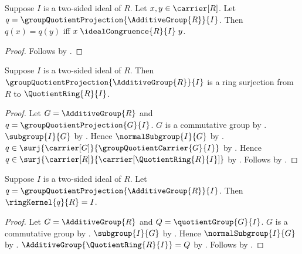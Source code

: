 \begin{corollary}\label{quotient_ring_projection_eq_iff_ideal_congruence}
    Suppose $I$ is a two-sided ideal of $R$.
    Let $x,y\in\carrier[R]$.
    Let $q=\groupQuotientProjection{\AdditiveGroup{R}}{I}$.
    Then $q(x)=q(y)$ iff $x\mathrel{\idealCongruence{R}{I}}y$.
\end{corollary}
\begin{proof}
    Follows by
        .
\end{proof}

\begin{theorem}\label{quotient_ring_projection_surjective}
    Suppose $I$ is a two-sided ideal of $R$.
    Then $\groupQuotientProjection{\AdditiveGroup{R}}{I}$ is a ring
        surjection from $R$ to $\QuotientRing{R}{I}$.
\end{theorem}
\begin{proof}
    Let $G=\AdditiveGroup{R}$ and $q=\groupQuotientProjection{G}{I}$.
    $G$ is a commutative group by
        .
    $\subgroup{I}{G}$ by
        .
    Hence $\normalSubgroup{I}{G}$ by
        .
    $q\in\surj{\carrier[G]}{\groupQuotientCarrier{G}{I}}$ by
        .
    Hence $q\in\surj{\carrier[R]}{\carrier[\QuotientRing{R}{I}]}$ by
        .
    Follows by
        .
\end{proof}

\begin{theorem}\label{quotient_ring_projection_kernel}
    Suppose $I$ is a two-sided ideal of $R$.
    Let $q=\groupQuotientProjection{\AdditiveGroup{R}}{I}$.
    Then $\ringKernel{q}{R}=I$.
\end{theorem}
\begin{proof}
    Let $G=\AdditiveGroup{R}$ and $Q=\quotientGroup{G}{I}$.
    $G$ is a commutative group by
        .
    $\subgroup{I}{G}$ by
        .
    Hence $\normalSubgroup{I}{G}$ by
        .
    $\AdditiveGroup{\QuotientRing{R}{I}}=Q$ by
        .
    Follows by
        .
\end{proof}

